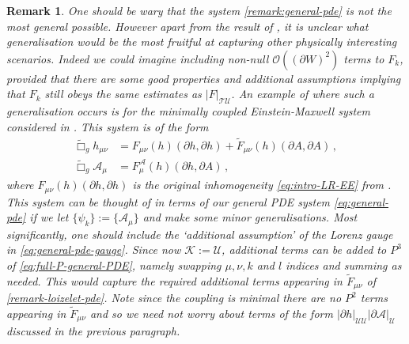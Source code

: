 \documentclass[11pt, a4paper]{amsart}
\numberwithin{equation}{section}
\newtheorem{remark}[theorem]{Remark}
\numberwithin{theorem}{section}
\newcommand{\p}{\partial}
\newcommand{\A}{\mathcal{A}}
\newcommand{\mn}{{\mu \nu}}
\newcommand{\tbox}{\widetilde{\Box}}
\newcommand{\UU}{{\mathcal{U} \mathcal{U}}}
\newcommand{\TU}{{\mathcal{T} \mathcal{U}}}
\newcommand{\U}{\mathcal{U}}
\newcommand{\K}{\mathcal{K}}
\begin{document}
\begin{remark}
 One should be wary that the system \eqref{remark:general-pde} is not the most general possible. However apart from the result of \cite{MR2582443}, it is unclear what generalisation would be the most fruitful at capturing other physically interesting scenarios. Indeed we could imagine including non-null $\mathcal{O}((\p W)^2)$ terms to $F_k$, provided that there are some good properties and additional assumptions implying that $F_k$ still obeys the same estimates as $\vert F \vert_\TU$. An example of where such a generalisation occurs is for the minimally coupled Einstein-Maxwell system considered in \cite{MR2582443}. This system is of the form
\begin{equation} \begin{split}
\tbox_g h_\mn & = F_\mn (h)(\p h, \p h) + \widetilde{F}_\mn (h)(\p A, \p A) \,, \\
\tbox_g \mathcal{A}_\mu & = F^\A_\mu (h) (\p h, \p A) \,, \end{split} \label{remark-loizelet-pde} \end{equation}
where $F_\mn(h)(\p h, \p h)$ is the original inhomogeneity \eqref{eq:intro-LR-EE} from \cite{LR:04}.  This system can be thought of in terms of our general PDE system \eqref{eq:general-pde} if we let $\{ \psi_k \}:= \{ \mathcal{A}_\mu \}$ and make some minor generalisations. Most significantly, one should include the `additional assumption' of the Lorenz gauge in \eqref{eq:general-pde-gauge}. Since  now $\K := \U$, additional terms can be added to $P^3$ of \eqref{eq:full-P-general-PDE}, namely swapping $\mu, \nu, k$ and $l$ indices and summing as needed. This would capture the required additional terms appearing in $\widetilde{F}_\mn $ of \eqref{remark-loizelet-pde}. Note since the coupling is minimal there are no $P^2$ terms appearing in $\widetilde{F}_\mn $ and so we need not worry about terms of the form $\vert \p h \vert_\UU \vert \p \A \vert_\U$ discussed in the previous paragraph. 


\end{remark}
\end{document}

